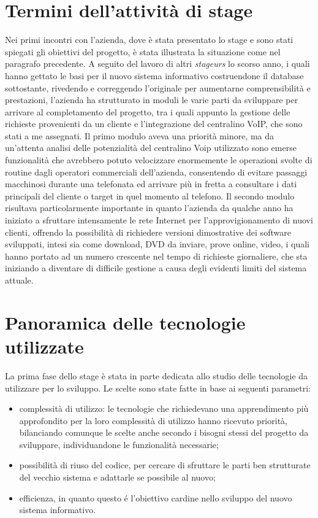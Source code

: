 \section{Termini dell'attivit\` a di stage}
Nei primi incontri con l'azienda, dove \` e stata presentato lo stage e sono stati spiegati gli obiettivi del progetto, \` e stata illustrata la situazione come nel paragrafo precedente. A seguito del lavoro di altri \textit{stageurs} lo scorso anno, i quali hanno gettato le basi per il nuovo sistema informativo costruendone il database sottostante, rivedendo e correggendo l'originale per aumentarne comprensibilit\` a e prestazioni, l'azienda ha strutturato in moduli le varie parti da sviluppare per arrivare al completamento del progetto, tra i quali appunto la gestione delle richieste provenienti da un cliente e l'integrazione del centralino VoIP, che sono stati a me assegnati. 
Il primo modulo aveva una priorit\` a minore, ma da un'attenta analisi delle potenzialit\` a del centralino Voip utilizzato sono emerse funzionalit\` a che avrebbero potuto velocizzare enormemente le operazioni svolte di routine dagli operatori commerciali dell'azienda, consentendo di evitare passaggi macchinosi durante una telefonata ed arrivare pi\` u in fretta a consultare i dati principali del cliente o target in quel momento al telefono.
Il secondo modulo risultava particolarmente importante in quanto l'azienda da qualche anno ha iniziato a sfruttare intensamente le rete Internet per l'approvigionamento di nuovi clienti, offrendo la possibilit\` a di richiedere versioni dimostrative dei software sviluppati, intesi sia come download, DVD da inviare, prove online, video, i quali hanno portato ad un numero crescente nel tempo di richieste giornaliere, che sta iniziando a diventare di difficile gestione a causa degli evidenti limiti del sistema attuale. 


\section{Panoramica delle tecnologie utilizzate}
La prima fase dello stage \`e stata in parte dedicata allo studio delle tecnologie da utilizzare per lo sviluppo. Le scelte sono state fatte in base ai seguenti parametri:
\begin{itemize}
  \item complessit\`a di utilizzo: le tecnologie che richiedevano una apprendimento pi\`u approfondito per la loro 
  complessit\`a di utilizzo hanno ricevuto priorit\`a, bilanciando comunque le scelte anche secondo i bisogni stessi del
progetto da sviluppare, individuandone le funzionalit\`a necessarie;
  \item possibilit\`a di riuso del codice, per cercare di sfruttare le parti ben strutturate del vecchio sistema e adattarle se possibile al
nuovo;
  \item efficienza, in quanto questo \'e l'obiettivo cardine nello sviluppo del nuovo sistema informativo.

\end{itemize}

